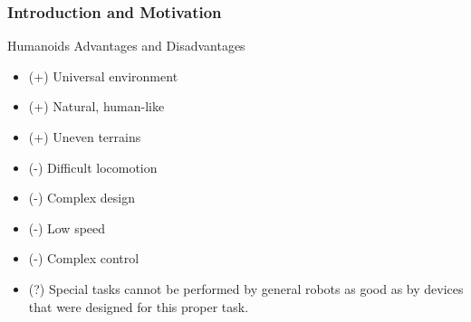 \documentclass{beamer}
\begin{document}

\begin{frame}
	\frametitle{Introduction and Motivation}
	\begin{block}{Humanoids Advantages and Disadvantages}
		\begin{itemize}
			\item(+)
				Universal environment
			\item(+)
				Natural, human-like
			\item(+)
				Uneven terrains
			\item(-)
				Difficult locomotion
			\item(-)
				Complex design
			\item(-)
				Low speed
			\item(-)
				Complex control
			\item(?) Special tasks cannot be performed by general robots as good as by devices that were designed for this proper task.
		\end{itemize}
	\end{block}
\end{frame}

\end{document}
